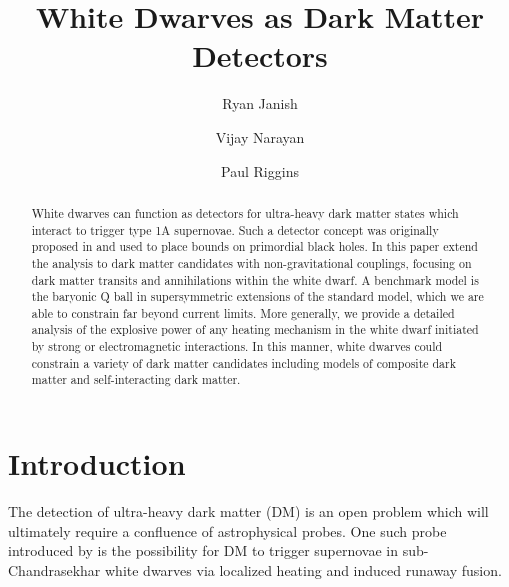 \documentclass[twocolumn,showpacs,preprintnumbers,amsmath,amssymb,prl]{revtex4}
\begin{document}
\title{White Dwarves as Dark Matter Detectors}


\author{Ryan Janish}

\author{Vijay Narayan}

\author{Paul Riggins}

\begin{abstract}

White dwarves can function as detectors for ultra-heavy dark matter states which interact to trigger type 1A supernovae. Such a detector concept was originally proposed in \cite{Graham:2015apa} and used to place bounds on primordial black holes. In this paper extend the analysis to dark matter candidates with non-gravitational couplings, focusing on dark matter transits and annihilations within the white dwarf. A benchmark model is the baryonic Q ball in supersymmetric extensions of the standard model, which we are able to constrain far beyond current limits. More generally, we provide a detailed analysis of the explosive power of any heating mechanism in the white dwarf initiated by strong or electromagnetic interactions. In this manner, white dwarves could constrain a variety of dark matter candidates including models of composite dark matter and self-interacting dark matter.  

\end{abstract}
\maketitle


\section{Introduction}

The detection of ultra-heavy dark matter (DM) is an open problem which will ultimately require a confluence of astrophysical probes. One such probe introduced by \cite{Graham:2015apa} is the possibility for DM to trigger supernovae in sub-Chandrasekhar white dwarves via localized heating and induced runaway fusion. 
\end{document}

